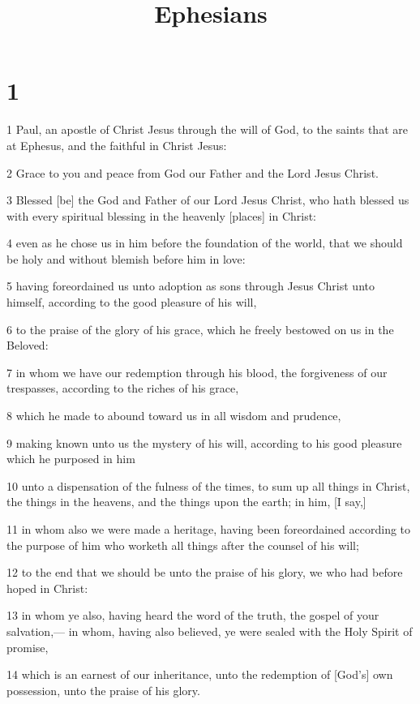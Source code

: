 

\title{Ephesians}

\chapter{1}

\par 1 Paul, an apostle of Christ Jesus through the will of God, to the saints that are at Ephesus, and the faithful in Christ Jesus:
\par 2 Grace to you and peace from God our Father and the Lord Jesus Christ.
\par 3 Blessed [be] the God and Father of our Lord Jesus Christ, who hath blessed us with every spiritual blessing in the heavenly [places] in Christ:
\par 4 even as he chose us in him before the foundation of the world, that we should be holy and without blemish before him in love:
\par 5 having foreordained us unto adoption as sons through Jesus Christ unto himself, according to the good pleasure of his will,
\par 6 to the praise of the glory of his grace, which he freely bestowed on us in the Beloved:
\par 7 in whom we have our redemption through his blood, the forgiveness of our trespasses, according to the riches of his grace,
\par 8 which he made to abound toward us in all wisdom and prudence,
\par 9 making known unto us the mystery of his will, according to his good pleasure which he purposed in him
\par 10 unto a dispensation of the fulness of the times, to sum up all things in Christ, the things in the heavens, and the things upon the earth; in him, [I say,]
\par 11 in whom also we were made a heritage, having been foreordained according to the purpose of him who worketh all things after the counsel of his will;
\par 12 to the end that we should be unto the praise of his glory, we who had before hoped in Christ:
\par 13 in whom ye also, having heard the word of the truth, the gospel of your salvation,— in whom, having also believed, ye were sealed with the Holy Spirit of promise,
\par 14 which is an earnest of our inheritance, unto the redemption of [God's] own possession, unto the praise of his glory.
